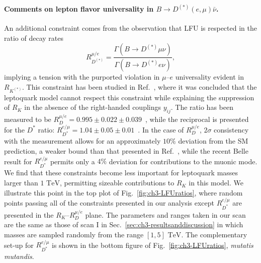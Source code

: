 \paragraph{Comments on lepton flavor universality in $B \to
  D^{(*)} (e,\mu) \bar{\nu}$.} An additional constraint comes from the
observation that LFU is respected in the ratio of decay rates
\begin{equation}
  R_{D^{(*)}}^{\mu/e} = \frac{\Gamma(B \rightarrow
    D^{(*)} \mu \nu)}{\Gamma(B \rightarrow
    D^{(*)} e \nu)},
\end{equation}
implying a tension with the purported violation in $\mu$--$e$ universality
evident in $R_{K^{(*)}}$. This constraint has been studied in
Ref.~\cite{Becirevic:2016oho}, where it was concluded that the leptoquark model
cannot respect this constraint while explaining the suppression of $R_K$ in the
absence of the right-handed couplings $y_{ij}$. The ratio has been measured to
be $R_D^{\mu/e} = 0.995 \pm 0.022 \pm 0.039$~\cite{Glattauer:2015teq}, while the
reciprocal is presented for the $D^*$ ratio: $R_{D^{*}}^{e/\mu} = 1.04 \pm 0.05
\pm 0.01$~\cite{Abdesselam:2017kjf}. In the case of $R_D^{\mu/e}$, $2\sigma$
consistency with the measurement allows for an approximately $10\%$ deviation
from the SM prediction, a weaker bound than that presented in
Ref.~\cite{Becirevic:2016oho}, while the recent Belle result for
$R_{D^{*}}^{e/\mu}$ permits only a $4\%$ deviation for contributions to the
muonic mode. We find that these constraints become less important for leptoquark
masses larger than $ 1 \text{ TeV}$, permitting sizeable contributions to $R_K$
in this model. We illustrate this point in the top plot of
Fig.~\ref{fig:ch3-LFUratios}, where random points passing all of the constraints
presented in our analysis except $R_{D^{*}}^{e/\mu}$ are presented in the
$R_K$--$R_D^{\mu/e}$ plane. The parameters and ranges taken in our scan are the
same as those of scan I in Sec.~\ref{sec:ch3-resultsanddiscussion} in which masses
are sampled randomly from the range $[1,5] \text{ TeV}$. The complementary
set-up for $R_{D^{*}}^{e/\mu}$ is shown in the bottom figure of
Fig.~\ref{fig:ch3-LFUratios}, \textit{mutatis mutandis}.

